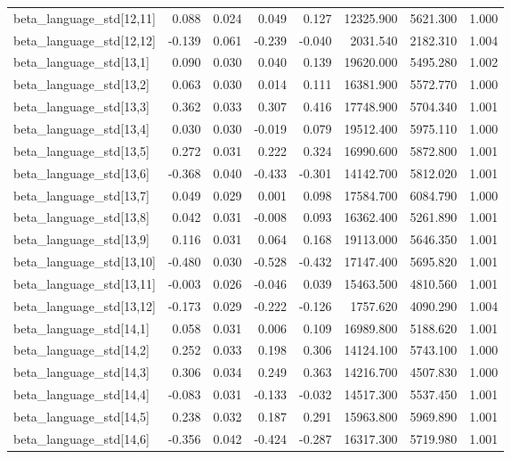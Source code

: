 \begin{tabular}{lrrrrrrr}
beta\_language\_std[12,11] & 0.088 & 0.024 & 0.049 & 0.127 & 12325.900 & 5621.300 & 1.000 \\
beta\_language\_std[12,12] & -0.139 & 0.061 & -0.239 & -0.040 & 2031.540 & 2182.310 & 1.004 \\
beta\_language\_std[13,1] & 0.090 & 0.030 & 0.040 & 0.139 & 19620.000 & 5495.280 & 1.002 \\
beta\_language\_std[13,2] & 0.063 & 0.030 & 0.014 & 0.111 & 16381.900 & 5572.770 & 1.000 \\
beta\_language\_std[13,3] & 0.362 & 0.033 & 0.307 & 0.416 & 17748.900 & 5704.340 & 1.001 \\
beta\_language\_std[13,4] & 0.030 & 0.030 & -0.019 & 0.079 & 19512.400 & 5975.110 & 1.000 \\
beta\_language\_std[13,5] & 0.272 & 0.031 & 0.222 & 0.324 & 16990.600 & 5872.800 & 1.001 \\
beta\_language\_std[13,6] & -0.368 & 0.040 & -0.433 & -0.301 & 14142.700 & 5812.020 & 1.001 \\
beta\_language\_std[13,7] & 0.049 & 0.029 & 0.001 & 0.098 & 17584.700 & 6084.790 & 1.000 \\
beta\_language\_std[13,8] & 0.042 & 0.031 & -0.008 & 0.093 & 16362.400 & 5261.890 & 1.001 \\
beta\_language\_std[13,9] & 0.116 & 0.031 & 0.064 & 0.168 & 19113.000 & 5646.350 & 1.001 \\
beta\_language\_std[13,10] & -0.480 & 0.030 & -0.528 & -0.432 & 17147.400 & 5695.820 & 1.001 \\
beta\_language\_std[13,11] & -0.003 & 0.026 & -0.046 & 0.039 & 15463.500 & 4810.560 & 1.001 \\
beta\_language\_std[13,12] & -0.173 & 0.029 & -0.222 & -0.126 & 1757.620 & 4090.290 & 1.004 \\
beta\_language\_std[14,1] & 0.058 & 0.031 & 0.006 & 0.109 & 16989.800 & 5188.620 & 1.001 \\
beta\_language\_std[14,2] & 0.252 & 0.033 & 0.198 & 0.306 & 14124.100 & 5743.100 & 1.000 \\
beta\_language\_std[14,3] & 0.306 & 0.034 & 0.249 & 0.363 & 14216.700 & 4507.830 & 1.000 \\
beta\_language\_std[14,4] & -0.083 & 0.031 & -0.133 & -0.032 & 14517.300 & 5537.450 & 1.001 \\
beta\_language\_std[14,5] & 0.238 & 0.032 & 0.187 & 0.291 & 15963.800 & 5969.890 & 1.001 \\
beta\_language\_std[14,6] & -0.356 & 0.042 & -0.424 & -0.287 & 16317.300 & 5719.980 & 1.001 \\

\end{tabular}
